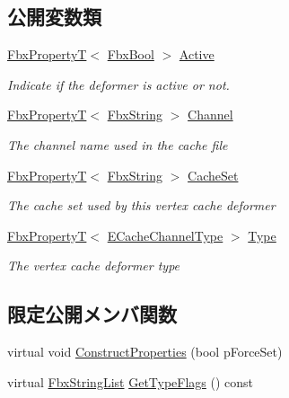 \subsection*{公開変数類}
\begin{DoxyCompactItemize}
\item 
\hyperlink{class_fbx_property_t}{Fbx\+PropertyT}$<$ \hyperlink{fbxtypes_8h_a92e0562b2fe33e76a242f498b362262e}{Fbx\+Bool} $>$ \hyperlink{class_fbx_vertex_cache_deformer_a12288746509d99e897af0786ec6fc33f}{Active}
\begin{DoxyCompactList}\small\item\em Indicate if the deformer is active or not. \end{DoxyCompactList}\item 
\hyperlink{class_fbx_property_t}{Fbx\+PropertyT}$<$ \hyperlink{class_fbx_string}{Fbx\+String} $>$ \hyperlink{class_fbx_vertex_cache_deformer_a70c66f374f95dd42c0ee91077b04cb42}{Channel}
\begin{DoxyCompactList}\small\item\em The channel name used in the cache file \end{DoxyCompactList}\item 
\hyperlink{class_fbx_property_t}{Fbx\+PropertyT}$<$ \hyperlink{class_fbx_string}{Fbx\+String} $>$ \hyperlink{class_fbx_vertex_cache_deformer_a2f320220fffbd0b7f20b074d7b2de4fb}{Cache\+Set}
\begin{DoxyCompactList}\small\item\em The cache set used by this vertex cache deformer \end{DoxyCompactList}\item 
\hyperlink{class_fbx_property_t}{Fbx\+PropertyT}$<$ \hyperlink{class_fbx_vertex_cache_deformer_a24f0c46d4f47717615852a8e7346efed}{E\+Cache\+Channel\+Type} $>$ \hyperlink{class_fbx_vertex_cache_deformer_a48db6d058d753fdfa14400a3f39d2260}{Type}
\begin{DoxyCompactList}\small\item\em The vertex cache deformer type \end{DoxyCompactList}\end{DoxyCompactItemize}
\subsection*{限定公開メンバ関数}
\begin{DoxyCompactItemize}
\item 
virtual void \hyperlink{class_fbx_vertex_cache_deformer_aed14ffc10416f556b602b87e8d8d6926}{Construct\+Properties} (bool p\+Force\+Set)
\item 
virtual \hyperlink{class_fbx_string_list}{Fbx\+String\+List} \hyperlink{class_fbx_vertex_cache_deformer_a67322e24180497b1f268cad5ed29c08b}{Get\+Type\+Flags} () const
\end{DoxyCompactItemize}
